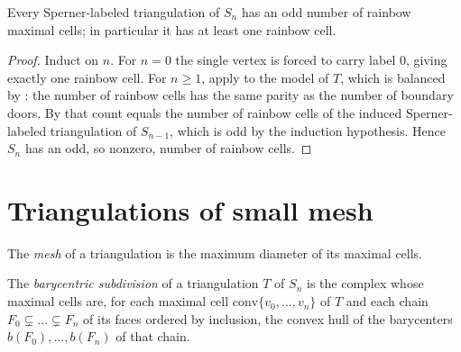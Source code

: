 \begin{lemma}
    \label{lem:sperner}
    Every Sperner-labeled triangulation of $S_n$ has an odd number of rainbow
    maximal cells; in particular it has at least one rainbow cell.
\end{lemma}
\begin{proof}
    Induct on $n$. For $n = 0$ the single vertex is forced to carry label $0$,
    giving exactly one rainbow cell. For $n \ge 1$, apply 
    to the model of $T$, which is balanced by
    : the number of rainbow cells has the
    same parity as the number of boundary doors. By 
    that count equals the number of rainbow cells of the induced Sperner-labeled
    triangulation of $S_{n-1}$, which is odd by the induction hypothesis. Hence
    $S_n$ has an odd, so nonzero, number of rainbow cells.
\end{proof}

\section{Triangulations of small mesh}

\begin{definition}[Mesh]
    \label{def:mesh}
    \leanok
    The \emph{mesh} of a triangulation is the maximum diameter of its maximal
    cells.
\end{definition}

\begin{definition}
    \label{def:barycentric-subdivision}
    The \emph{barycentric subdivision} of a triangulation $T$ of $S_n$ is the
    complex whose maximal cells are, for each maximal cell
    $\mathrm{conv}\{v_0, \dots, v_n\}$ of $T$ and each chain
    $F_0 \subsetneq \dots \subsetneq F_n$ of its faces ordered by inclusion, the
    convex hull of the barycenters $b(F_0), \dots, b(F_n)$ of that chain.
\end{definition}

